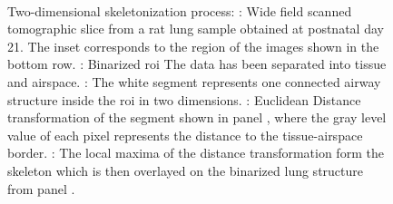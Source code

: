 \begin{figure}
{		\label{subfig:skel-c}%
		}%
	\\%
	\caption[\twod skeletonization]{Two-dimensional skeletonization process: : Wide field scanned tomographic slice from a rat lung sample obtained at postnatal day 21. The inset corresponds to the region of the images shown in the bottom row. : Binarized \ac{roi} The data has been separated into tissue and airspace. : The white segment represents one connected airway structure inside the \ac{roi} in two dimensions. : Euclidean Distance transformation of the segment shown in panel , where the gray level value of each pixel represents the distance to the tissue-airspace border. : The local maxima of the distance transformation form the skeleton which is then overlayed on the binarized lung structure from panel .}%

\end{figure}
